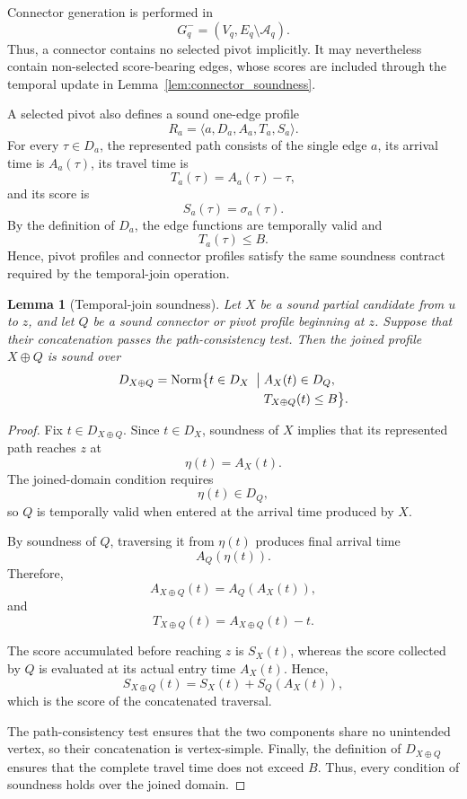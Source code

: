\documentclass[a4paper,fleqn]{cas-dc}
\newtheorem{lemma}{Lemma}
\begin{document}
Connector generation is performed in
\[
G_q^{-}
=
(V_q,E_q\setminus\mathcal A_q).
\]
Thus, a connector contains no selected pivot implicitly. It may nevertheless
contain non-selected score-bearing edges, whose scores are included through
the temporal update in Lemma~\ref{lem:connector_soundness}.

A selected pivot also defines a sound one-edge profile
\[
R_a
=
\langle
a,D_a,A_a,T_a,S_a
\rangle.
\]
For every \(\tau\in D_a\), the represented path consists of the single edge
\(a\), its arrival time is \(A_a(\tau)\), its travel time is
\[
T_a(\tau)=A_a(\tau)-\tau,
\]
and its score is
\[
S_a(\tau)=\sigma_a(\tau).
\]
By the definition of \(D_a\), the edge functions are temporally valid and
\[
T_a(\tau)\leq B.
\]
Hence, pivot profiles and connector profiles satisfy the same soundness
contract required by the temporal-join operation.

\begin{lemma}[Temporal-join soundness]
\label{lem:temporal_join_soundness}
Let \(X\) be a sound partial candidate from \(u\) to \(z\), and let \(Q\) be
a sound connector or pivot profile beginning at \(z\). Suppose that their
concatenation passes the path-consistency test. Then the joined profile
\(X\oplus Q\) is sound over
\[
\begin{aligned}
D_{X\oplus Q}
=
\operatorname{Norm}\bigl\{t\in D_X\;\bigm|\;&
A_X(t)\in D_Q,\\[-0.2ex]
& T_{X\oplus Q}(t)\leq B
\bigr\}.
\end{aligned}
\]
\end{lemma}

\begin{proof}
Fix \(t\in D_{X\oplus Q}\). Since \(t\in D_X\), soundness of \(X\) implies
that its represented path reaches \(z\) at
\[
\eta(t)=A_X(t).
\]
The joined-domain condition requires
\[
\eta(t)\in D_Q,
\]
so \(Q\) is temporally valid when entered at the arrival time produced by
\(X\).

By soundness of \(Q\), traversing it from \(\eta(t)\) produces final arrival
time
\[
A_Q(\eta(t)).
\]
Therefore,
\[
A_{X\oplus Q}(t)
=
A_Q(A_X(t)),
\]
and
\[
T_{X\oplus Q}(t)
=
A_{X\oplus Q}(t)-t.
\]

The score accumulated before reaching \(z\) is \(S_X(t)\), whereas the score
collected by \(Q\) is evaluated at its actual entry time \(A_X(t)\). Hence,
\[
S_{X\oplus Q}(t)
=
S_X(t)+S_Q(A_X(t)),
\]
which is the score of the concatenated traversal.

The path-consistency test ensures that the two components share no unintended
vertex, so their concatenation is vertex-simple. Finally, the definition of
\(D_{X\oplus Q}\) ensures that the complete travel time does not exceed \(B\).
Thus, every condition of soundness holds over the joined domain.
\end{proof}
\end{document}
